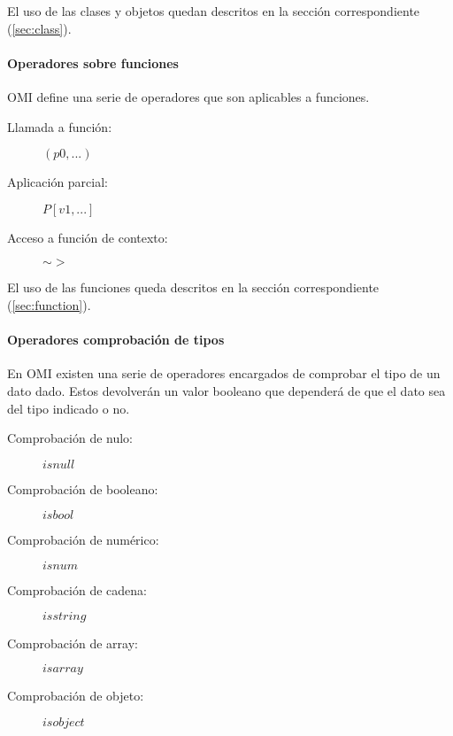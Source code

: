El uso de las clases y objetos quedan descritos en la sección correspondiente (\autoref{sec:class}).


\paragraph{Operadores sobre funciones} \label{sec:op_func}

OMI define una serie de operadores que son aplicables a funciones. 


\begin{description}
\item [Llamada a función:] $(p0,...)$
\item [Aplicación parcial:] $P[v1,...]$
\item [Acceso a función de contexto:] $\sim>$
\end{description} 

El uso de las funciones queda descritos en la sección correspondiente (\autoref{sec:function}).



\paragraph{Operadores comprobación de tipos} \label{sec:op_typecheck}
En OMI existen una serie de operadores encargados de comprobar el tipo de un dato dado. Estos devolverán
un valor booleano que dependerá de que el dato sea del tipo indicado o no.

\begin{description}
\item [Comprobación de nulo:] $isnull$
\item [Comprobación de booleano:] $isbool$
\item [Comprobación de numérico:] $isnum$
\item [Comprobación de cadena:] $isstring$
\item [Comprobación de array:] $isarray$
\item [Comprobación de objeto:] $isobject$
\end{description} 

